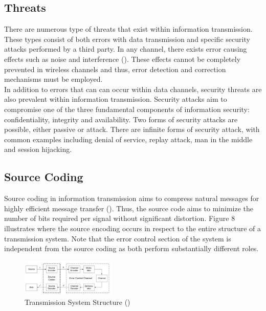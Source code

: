 \documentclass[]{article}
\begin{document}
\vspace*{0.8cm}
\subsection*{Threats}

There are numerous type of threats that exist within information transmission. These types consist of both errors with data transmission and specific security attacks performed by a third party. In any channel, there exists error causing effects such as noise and interference (\cite{lecture}). These effects cannot be completely prevented in wireless channels and thus, error detection and correction mechanisms must be employed.\\

In addition to errors that can can occur within data channels, security threats are also prevalent within information transmission. Security attacks aim to compromise one of the three fundamental components of information security: confidentiality, integrity and availability. Two forms of security attacks are possible, either passive or attack. There are infinite forms of security attack, with common examples including denial of service, replay attack, man in the middle and session hijacking.

\subsection*{Source Coding}

Source coding in information transmission aims to compress natural messages for highly efficient message transfer (\cite{source_coding}). Thus, the source code aims to minimize the number of bits required per signal without significant distortion. Figure 8 illustrates where the source encoding occurs in respect to the entire structure of a transmission system. Note that the error control section of the system is independent from the source coding as both perform substantially different roles.

\begin{figure}[H]
	\begin{center}
		\includegraphics[height=0.2\textheight,width=0.4\textwidth]{source_coding.png}
		\caption{Transmission System Structure (\cite{source_coding})}
		\label{fig:trans}		
	\end{center}
\end{figure}
\end{document}
